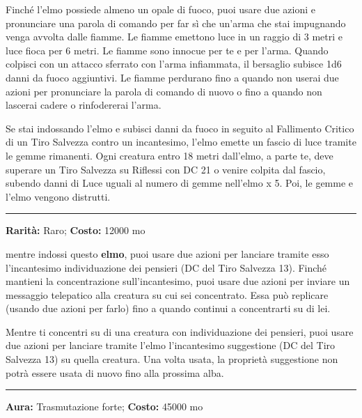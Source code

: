 \begin{multicols}{2}
Finché l'elmo possiede almeno un opale di fuoco, puoi usare due azioni e pronunciare una parola di comando per far sì che un'arma che stai impugnando venga avvolta dalle fiamme. Le fiamme emettono luce in un raggio di 3 metri e luce fioca per 6 metri. Le fiamme sono innocue per te e per l'arma. Quando colpisci con un attacco sferrato con l'arma infiammata, il bersaglio subisce 1d6 danni da fuoco aggiuntivi. Le fiamme perdurano fino a quando non userai due azioni per pronunciare la parola di comando di nuovo o fino a quando non lascerai cadere o rinfodererai l'arma.

Se stai indossando l'elmo e subisci danni da fuoco in seguito al Fallimento Critico di un Tiro Salvezza contro un incantesimo, l'elmo emette un fascio di luce tramite le gemme rimanenti. Ogni creatura entro 18 metri dall'elmo, a parte te, deve superare un Tiro Salvezza su Riflessi con DC 21 o venire colpita dal fascio, subendo danni di Luce uguali al numero di gemme nell'elmo x 5. Poi, le gemme e l'elmo vengono distrutti.

\smallskip\noindent\rule{\linewidth}{2pt}  \hypertarget{ElmodellaTelepatia}{}\smallskip{}\noindent\label{ElmodellaTelepatia}

\textbf{Rarità:} Raro; \textbf{Costo:} 12000 mo

mentre indossi questo \textbf{elmo}, puoi usare due azioni per lanciare tramite esso l'incantesimo individuazione dei pensieri (DC del Tiro Salvezza 13). Finché mantieni la concentrazione sull'incantesimo, puoi usare due azioni per inviare un messaggio telepatico alla creatura su cui sei concentrato. Essa può replicare (usando due azioni per farlo) fino a quando continui a concentrarti su di lei.

Mentre ti concentri su di una creatura con individuazione dei pensieri, puoi usare due azioni per lanciare tramite l'elmo l'incantesimo suggestione (DC del Tiro Salvezza 13) su quella creatura. Una volta usata, la proprietà suggestione non potrà essere usata di nuovo fino alla prossima alba.

\smallskip\noindent\rule{\linewidth}{2pt}  \hypertarget{EnergiaLuminosa}{}\smallskip{}\noindent\label{EnergiaLuminosa}

\textbf{Aura:} Trasmutazione forte; \textbf{Costo:} 45000 mo


\end{multicols}

